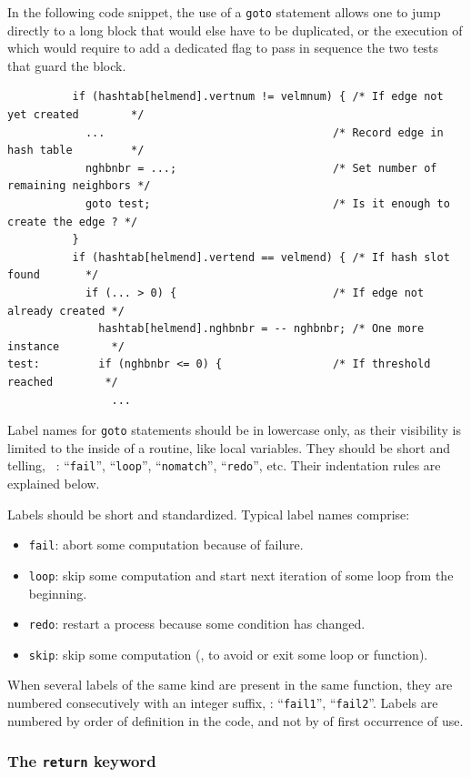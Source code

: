 In the following code snippet, the use of a \texttt{goto} statement
allows one to jump directly to a long block that would else have to be
duplicated, or the execution of which would require to add a dedicated
flag to pass in sequence the two tests that guard the block.
\begin{lstlisting}
          if (hashtab[helmend].vertnum != velmnum) { /* If edge not yet created        */
            ...                                   /* Record edge in hash table         */
            nghbnbr = ...;                        /* Set number of remaining neighbors */
            goto test;                            /* Is it enough to create the edge ? */
          }
          if (hashtab[helmend].vertend == velmend) { /* If hash slot found       */
            if (... > 0) {                        /* If edge not already created */
              hashtab[helmend].nghbnbr = -- nghbnbr; /* One more instance        */
test:         if (nghbnbr <= 0) {                 /* If threshold reached        */
                ...
\end{lstlisting}

Label names for \texttt{goto} statements should be in lowercase only,
as their visibility is limited to the inside of a routine, like local
variables. They should be short and telling, \eg~: ``\texttt{fail}'',
``\texttt{loop}'', ``\texttt{nomatch}'', ``\texttt{redo}'', etc. Their
indentation rules are explained below.

Labels should be short and standardized. Typical label names comprise:
\begin{itemize}
\item
\texttt{fail}: abort some computation because of failure.
\item
\texttt{loop}: skip some computation and start next iteration of
some loop from the beginning.
\item
\texttt{redo}: restart a process because some condition has changed.
\item
\texttt{skip}: skip some computation (\eg, to avoid or exit some loop
or function).
\end{itemize}

When several labels of the same kind are present in the same function,
they are numbered consecutively with an integer suffix, \eg:
``\texttt{fail1}'', ``\texttt{fail2}''. Labels are numbered by order
of definition in the code, and not by of first occurrence of use.

\subsubsection{The \texttt{return} keyword}

